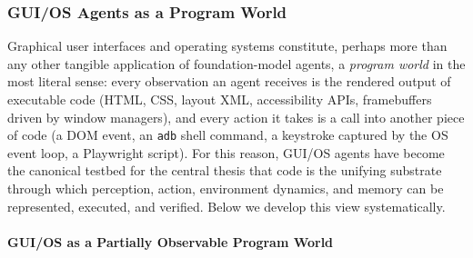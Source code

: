 \subsubsection{GUI/OS Agents as a Program World}

Graphical user interfaces and operating systems constitute, perhaps more than any other tangible application of foundation-model agents, a \textit{program world} in the most literal sense: every observation an agent receives is the rendered output of executable code (HTML, CSS, layout XML, accessibility APIs, framebuffers driven by window managers), and every action it takes is a call into another piece of code (a DOM event, an \texttt{adb} shell command, a keystroke captured by the OS event loop, a Playwright script). For this reason, GUI/OS agents have become the canonical testbed for the central thesis that code is the unifying substrate through which perception, action, environment dynamics, and memory can be represented, executed, and verified. Below we develop this view systematically.


\paragraph{GUI/OS as a Partially Observable Program World}


